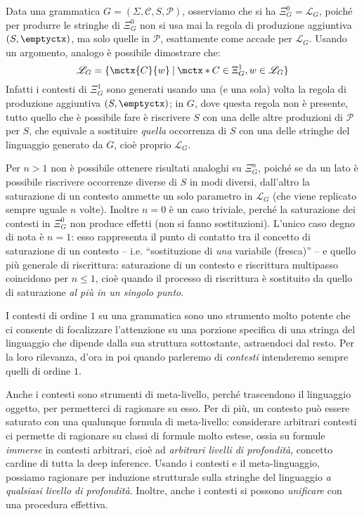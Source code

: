 \documentclass[12pt,a4paper,openright,twoside]{report}
\begin{document}
Data una grammatica $G = (\Sigma, \mathcal{C}, S, \mathcal{P})$, osserviamo che si ha $\Xi_G^0 = \mathscr{L}_G$, poich\'e per produrre le stringhe di $\Xi_G^0$ non si usa mai la regola di produzione aggiuntiva $(S, \emptyctx)$, ma solo quelle in $\mathcal{P}$, esattamente come accade per $\mathscr{L}_G$. Usando un argomento, analogo \`e possibile dimostrare che:
$$
	\mathscr{L}_G = \{ \mctx{C}{w} \:|\: \mctx*{C} \in \Xi_G^1, w \in \mathscr{L}_G \}
$$
Infatti i contesti di $\Xi_G^1$ sono generati usando una (e una sola) volta la regola di produzione aggiuntiva $(S, \emptyctx)$; in $G$, dove questa regola non \`e presente, tutto quello che \`e possibile fare \`e riscrivere $S$ con una delle altre produzioni di $\mathcal{P}$ per $S$, che equivale a sostituire \emph{quella} occorrenza di $S$ con una delle stringhe del linguaggio generato da $G$, cio\`e proprio $\mathscr{L}_G$.

Per $n > 1$ non \`e possibile ottenere risultati analoghi su $\Xi_G^n$, poich\'e se da un lato \`e possibile riscrivere occorrenze diverse di $S$ in modi diversi, dall'altro la saturazione di un contesto ammette un solo parametro in $\mathscr{L}_G$ (che viene replicato sempre uguale $n$ volte). Inoltre $n = 0$ \`e un caso triviale, perch\'e la saturazione dei contesti in $\Xi_G^0$ non produce effetti (non si fanno sostituzioni). L'unico caso degno di nota \`e $n = 1$: esso rappresenta il punto di contatto tra il concetto di saturazione di un contesto -- i.e. ``sostituzione di \emph{una} variabile (fresca)'' -- e quello pi\`u generale di riscrittura: saturazione di un contesto e riscrittura multipasso coincidono per $n \le 1$, cio\`e quando il processo di riscrittura \`e sostituito da quello di saturazione \emph{al pi\`u in un singolo punto}.

I contesti di ordine $1$ su una grammatica sono uno strumento molto potente che ci consente di focalizzare l'attenzione su una porzione specifica di una stringa del linguaggio che dipende dalla sua struttura sottostante, astraendoci dal resto. Per la loro rilevanza, d'ora in poi quando parleremo di \emph{contesti} intenderemo sempre quelli di ordine $1$. 

Anche i contesti sono strumenti di meta-livello, perch\'e trascendono il linguaggio oggetto, per permetterci di ragionare su esso. Per di pi\`u, un contesto pu\`o essere saturato con una qualunque formula di meta-livello: considerare arbitrari contesti ci permette di ragionare su classi di formule molto estese, ossia su formule \emph{immerse} in contesti arbitrari, cio\`e ad \emph{arbitrari livelli di profondit\`a}, concetto cardine di tutta la deep inference. Usando i contesti e il meta-linguaggio, possiamo ragionare per induzione strutturale sulla stringhe del linguaggio \emph{a qualsiasi livello di profondit\`a}. Inoltre, anche i contesti si possono \emph{unificare} con una procedura effettiva.
\end{document}
